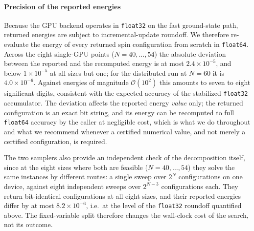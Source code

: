 \documentclass[preprint,12pt,a4paper]{elsarticle}
\begin{document}
\paragraph{Precision of the reported energies}
Because the GPU backend operates in \texttt{float32} on the fast ground-state
path, returned energies are subject to incremental-update roundoff. We therefore
re-evaluate the energy of every returned spin configuration from scratch in
\texttt{float64}. Across the eight single-GPU points ($N=40,\dots,54$) the
absolute deviation between the reported and the recomputed energy is at most
$2.4\times 10^{-5}$, and below $1\times 10^{-5}$ at all sizes but one; for the
distributed run at $N=60$ it is $4.0\times 10^{-6}$. Against energies of
magnitude $\mathcal{O}(10^{2})$ this amounts to seven to eight significant
digits, consistent with the expected accuracy of the stabilized \texttt{float32}
accumulator. The deviation affects the reported energy \emph{value} only; the
returned configuration is an exact bit string, and its energy can be recomputed
to full \texttt{float64} accuracy by the caller at negligible cost, which is what
we do throughout and what we recommend whenever a certified numerical value, and
not merely a certified configuration, is required.

The two samplers also provide an independent check of the decomposition itself,
since at the eight sizes where both are feasible ($N=40,\dots,54$) they solve the
same instances by different routes: a single sweep over $2^{N}$ configurations on
one device, against eight independent sweeps over $2^{N-3}$ configurations each.
They return bit-identical configurations at all eight sizes, and their reported
energies differ by at most $8.2\times 10^{-6}$, i.e.\ at the level of the
\texttt{float32} roundoff quantified above. The fixed-variable split therefore
changes the wall-clock cost of the search, not its outcome.
\end{document}
